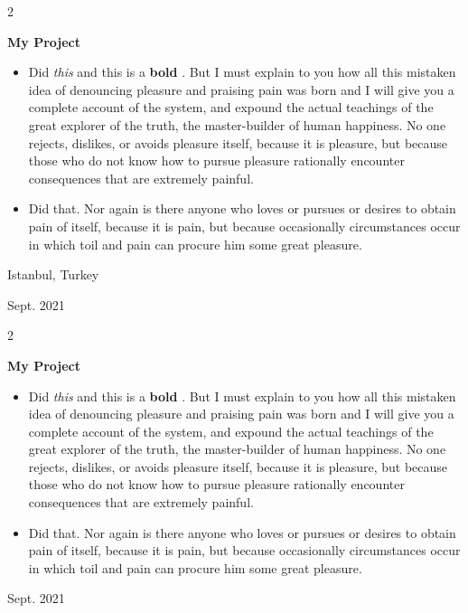 \documentclass[10pt, letterpaper]{article}
\newenvironment{highlights}{
    \begin{itemize}[
        topsep=0.10 cm,
        parsep=0.10 cm,
        partopsep=0pt,
        itemsep=0pt,
        leftmargin=0.4 cm + 10pt
    ]
}{
    \end{itemize}
} %
\newenvironment{twocolentry}[2][]{
    \onecolentry
    \def\secondColumn{#2}
    \setcolumnwidth{\fill, 4.5 cm}
    \begin{paracol}{2}
}{
    \switchcolumn \raggedleft \secondColumn
    \end{paracol}
    \endonecolentry
} %
\let\hrefWithoutArrow\href
\renewcommand{\href}[2]{\hrefWithoutArrow{#1}{\mbox{\ifthenelse{\equal{#2}{}}{ }{#2 }\raisebox{.15ex}{\footnotesize \faExternalLink*}}}}
\begin{document}
        \vspace{0.2 cm}

        \begin{twocolentry}{
            Istanbul, Turkey

        Sept. 2021
        }
            \textbf{My Project}
            \begin{highlights}
                \item Did \textit{this} and this is a \textbf{bold} \href{https://example.com}{link}. But I must explain to you how all this mistaken idea of denouncing pleasure and praising pain was born and I will give you a complete account of the system, and expound the actual teachings of the great explorer of the truth, the master-builder of human happiness. No one rejects, dislikes, or avoids pleasure itself, because it is pleasure, but because those who do not know how to pursue pleasure rationally encounter consequences that are extremely painful.
                \item Did that. Nor again is there anyone who loves or pursues or desires to obtain pain of itself, because it is pain, but because occasionally circumstances occur in which toil and pain can procure him some great pleasure.
            \end{highlights}
        \end{twocolentry}


        \vspace{0.2 cm}

        \begin{twocolentry}{
            Sept. 2021
        }
            \textbf{My Project}
            \begin{highlights}
                \item Did \textit{this} and this is a \textbf{bold} \href{https://example.com}{link}. But I must explain to you how all this mistaken idea of denouncing pleasure and praising pain was born and I will give you a complete account of the system, and expound the actual teachings of the great explorer of the truth, the master-builder of human happiness. No one rejects, dislikes, or avoids pleasure itself, because it is pleasure, but because those who do not know how to pursue pleasure rationally encounter consequences that are extremely painful.
                \item Did that. Nor again is there anyone who loves or pursues or desires to obtain pain of itself, because it is pain, but because occasionally circumstances occur in which toil and pain can procure him some great pleasure.
            \end{highlights}
        \end{twocolentry}
\end{document}
